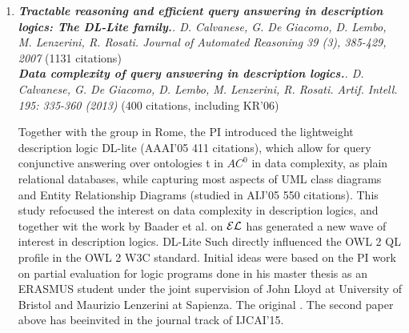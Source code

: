 \begin{enumerate}
\item \textit{\textbf{Tractable reasoning and efficient query answering in description logics: The DL-Lite family.}. D. Calvanese, G. De Giacomo, D. Lembo, M. Lenzerini, R. Rosati.
Journal of Automated Reasoning 39 (3), 385-429, 2007} (1131 citations) \\[1ex]
\textit{\textbf{Data complexity of query answering in description logics.}. D. Calvanese, G. De Giacomo, D. Lembo, M. Lenzerini, R. Rosati.
Artif. Intell. 195: 335-360 (2013)} (400 citations, including KR'06)




Together with the group in Rome, the PI introduced the lightweight
description logic DL-lite (AAAI'05 411 citations), which allow for
query conjunctive answering over ontologies t in $\mathit{AC}^0$ in
data complexity, as plain relational databases, while capturing most
aspects of UML class diagrams and Entity Relationship Diagrams (studied in AIJ'05 550 citations). This
study refocused the interest on data complexity in description logics,
and together wit the work by Baader et al. on $\cal{EL}$ has generated
a new wave of interest in description logics. DL-Lite Such directly
influenced the OWL 2 QL profile in the OWL 2 W3C standard. Initial
ideas were based on the PI work on partial evaluation for logic
programs done in his master thesis as an ERASMUS student under the
joint supervision of John Lloyd at University of Bristol and Maurizio
Lenzerini at Sapienza. The original . The second paper above has beeinvited in the journal track of IJCAI'15.




\end{enumerate}
